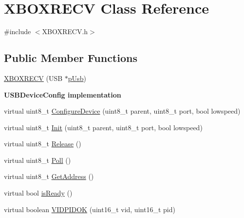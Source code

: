 \hypertarget{class_x_b_o_x_r_e_c_v}{\section{\-X\-B\-O\-X\-R\-E\-C\-V \-Class \-Reference}
\label{class_x_b_o_x_r_e_c_v}
}


{\ttfamily \#include $<$\-X\-B\-O\-X\-R\-E\-C\-V.\-h$>$}

\subsection*{\-Public \-Member \-Functions}
\begin{DoxyCompactItemize}
\item 
\hyperlink{class_x_b_o_x_r_e_c_v_ac856259af28db351f85302b5eddabf1d}{\-X\-B\-O\-X\-R\-E\-C\-V} (\-U\-S\-B $\ast$\hyperlink{class_x_b_o_x_r_e_c_v_a53047c86c8c2f625916af62238d50fc8}{p\-Usb})
\end{DoxyCompactItemize}
\begin{Indent}{\bf \-U\-S\-B\-Device\-Config implementation}\par
\begin{DoxyCompactItemize}
\item 
virtual uint8\-\_\-t \hyperlink{class_x_b_o_x_r_e_c_v_a3dd42b9a1351f172fc6e39df2fe99398}{\-Configure\-Device} (uint8\-\_\-t parent, uint8\-\_\-t port, bool lowspeed)
\item 
virtual uint8\-\_\-t \hyperlink{class_x_b_o_x_r_e_c_v_a07de216bf16a83501d74463c00bf1fc8}{\-Init} (uint8\-\_\-t parent, uint8\-\_\-t port, bool lowspeed)
\item 
virtual uint8\-\_\-t \hyperlink{class_x_b_o_x_r_e_c_v_ad0e6b53a818516b7d6af0beaa8cebc7a}{\-Release} ()
\item 
virtual uint8\-\_\-t \hyperlink{class_x_b_o_x_r_e_c_v_aafe1688ba3dc9b9ac425ebbbf001a1cc}{\-Poll} ()
\item 
virtual uint8\-\_\-t \hyperlink{class_x_b_o_x_r_e_c_v_a2d58b0a20eb804d853713ade83d01631}{\-Get\-Address} ()
\item 
virtual bool \hyperlink{class_x_b_o_x_r_e_c_v_a570568108edafee8d060aad8fe40db57}{is\-Ready} ()
\item 
virtual boolean \hyperlink{class_x_b_o_x_r_e_c_v_a3881c65a52835e2eb824af1bde0a4192}{\-V\-I\-D\-P\-I\-D\-O\-K} (uint16\-\_\-t vid, uint16\-\_\-t pid)
\end{DoxyCompactItemize}
\end{Indent}
